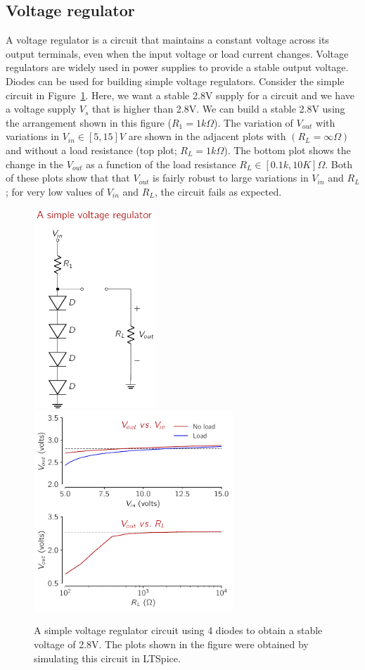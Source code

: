 \subsection{Voltage regulator}
A voltage regulator is a circuit that maintains a constant voltage across its output terminals, even when the input voltage or load current changes. Voltage regulators are widely used in power supplies to provide a stable output voltage. Diodes can be used for building simple voltage regulators. Consider the simple circuit in Figure~\ref{fig:03-diode-voltreg1}. Here, we want a stable 2.8V supply for a circuit and we have a voltage supply $V_s$ that is higher than 2.8V. We can build a stable 2.8V using the arrangement shown in this figure ($R_1 = 1k\Omega$). The variation of $V_{out}$ with variations in $V_{in} \in [5, 15]V$ are shown in the adjacent plots with $\left(R_L = \infty \Omega\right)$ and without a load resistance (top plot; $R_L = 1k\Omega$). The bottom plot shows the change in the $V_{out}$ as a function of the load resistance $R_L \in [0.1k, 10K]\Omega$. Both of these plots show that that $V_{out}$ is fairly robust to large variations in $V_{in}$ and $R_L$; for very low values of $V_{in}$ and $R_L$, the circuit fails as expected.

\begin{figure}[htbp]
    \centering
    \includegraphics[height=7.5cm]{figures/ch03/fig03-diode-ckt-voltreg.pdf}
    \hspace{1em} %
    \includegraphics[height=7.5cm]{figures/ch03/fig03-diode-simplevoltreg-plot.pdf}
    \caption{A simple voltage regulator circuit using 4 diodes to obtain a stable voltage of 2.8V. The plots shown in the figure were obtained by simulating this circuit in LTSpice.}
    \label{fig:03-diode-voltreg1}
\end{figure}

